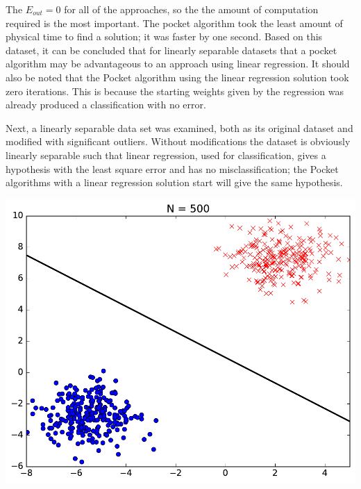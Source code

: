 \documentclass[a4paper]{article}
\begin{document}
\begin {description}
\begin{doublespace}
The $E_{out} =0$ for all of the approaches, so the the amount of computation required is the most important. The pocket algorithm took the least amount of physical time to find a solution; it was faster by one second. Based on this dataset, it can be concluded that for linearly separable datasets that a pocket algorithm may be advantageous to an approach using linear regression. It should also be noted that the Pocket algorithm using the linear regression solution took zero iterations. This is because the starting weights given by the regression was already produced a classification with no error.

\newpage
Next, a linearly separable data set was examined, both as its original dataset and modified with significant outliers. Without modifications the dataset is obviously linearly separable such that linear regression, used for classification, gives a hypothesis with the least square error and has no misclassification; the Pocket algorithms with a linear regression solution start will give the same hypothesis.

\begin{center}
\includegraphics[scale=0.5]{No_Outliers/linear_regression.pdf}
\end{center}


\end{doublespace}
\end{description}
\end{document}
